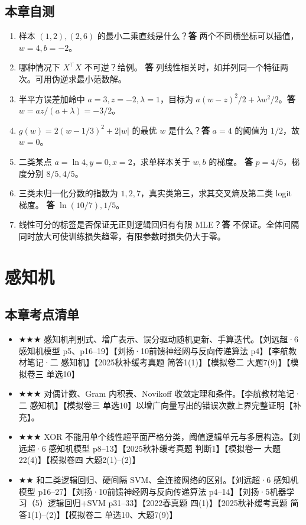 \documentclass[UTF8,a4paper,zihao=-4,fontset=fandol]{ctexrep}
\begin{document}
\section{本章自测}
\begin{enumerate}[leftmargin=2em]
\item 样本 \((1,2),(2,6)\) 的最小二乘直线是什么？\textbf{答} 两个不同横坐标可以插值，\(w=4,b=-2\)。
\item 哪种情况下 \(X^\top X\) 不可逆？给例。 \textbf{答} 列线性相关时，如并列同一个特征两次。可用伪逆求最小范数解。
\item 半平方误差加岭中 \(a=3,z=-2,\lambda=1\)，目标为 \(a(w-z)^2/2+\lambda w^2/2\)。\textbf{答} \(w=az/(a+\lambda)=-3/2\)。
\item \(g(w)=2(w-1/3)^2+2|w|\) 的最优 \(w\) 是什么？\textbf{答} \(a=4\) 的阈值为 \(1/2\)，故 \(w=0\)。
\item 二类某点 \(a=\ln4,y=0,x=2\)，求单样本关于 \(w,b\) 的梯度。 \textbf{答} \(p=4/5\)，梯度分别 \(8/5,4/5\)。
\item 三类未归一化分数的指数为 \(1,2,7\)，真实类第三，求其交叉熵及第二类 logit 梯度。 \textbf{答} \(\ln(10/7),1/5\)。
\item 线性可分的标签是否保证无正则逻辑回归有有限 MLE？\textbf{答} 不保证。全体间隔同时放大可使训练损失趋零，有限参数时损失仍大于零。
\end{enumerate}

\chapter{感知机}
\section{本章考点清单}
\begin{itemize}[leftmargin=2em]
\item \(\bigstar \bigstar \bigstar\) 感知机判别式、增广表示、误分驱动随机更新、手算迭代。【刘远超·6 感知机模型 p5、p16--19】【刘扬·10前馈神经网与反向传递算法 p4】【李航教材笔记·二 感知机】【2025秋补缓考真题 简答1(1)】【模拟卷二 大题7(9)】【模拟卷三 单选10】
\item \(\bigstar \bigstar \bigstar\) 对偶计数、Gram 内积表、Novikoff 收敛定理和条件。【李航教材笔记·二 感知机】【模拟卷三 单选10】以增广向量写出的错误次数上界完整证明【补充】。
\item \(\bigstar \bigstar \bigstar\) XOR 不能用单个线性超平面严格分类，阈值逻辑单元与多层构造。【刘远超·6 感知机模型 p8--13】【2025秋补缓考真题 判断1】【模拟卷一 大题22(4)】【模拟卷四 大题2(1)--(2)】
\item \(\bigstar \bigstar\) 和二类逻辑回归、硬间隔 SVM、全连接网络的区别。【刘远超·6 感知机模型 p16--27】【刘扬·10前馈神经网与反向传递算法 p4--14】【刘扬·5机器学习（5）逻辑回归+SVM p31--33】【2022春真题 四(1)】【2025秋补缓考真题 简答1(1)--(2)】【模拟卷二 单选10、大题7(9)】
\end{itemize}
\end{document}
